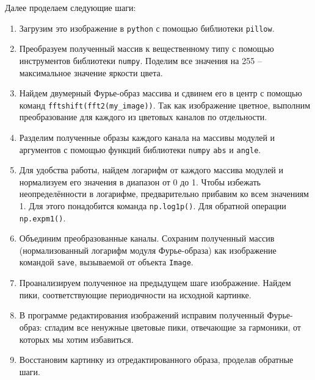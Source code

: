 \documentclass[a4paper, 12pt]{article}
\begin{document}
    Далее проделаем следующие шаги:
    \begin{enumerate}
        \item Загрузим это изображение в \texttt{python} с помощью библиотеки \texttt{pillow}.
        \item Преобразуем полученный массив к вещественному типу с помощью инструментов библиотеки \texttt{numpy}.
        Поделим все значения на 255 -- максимальное значение яркости цвета.
        \item Найдем двумерный Фурье-образ массива и сдвинем его в центр с помощью команд \texttt{fftshift(fft2(my\_image))}.
        Так как изображение цветное, выполним преобразование для каждого из цветовых каналов по отдельности.
        \item Разделим полученные образы каждого канала на массивы модулей и аргументов с помощью функций библиотеки \texttt{numpy} \texttt{abs} и \texttt{angle}.
        \item Для удобства работы, найдем логарифм от каждого массива модулей и нормализуем его
        значения в диапазон от 0 до 1. Чтобы избежать неопределённости в логарифме,
        предварительно прибавим ко всем значениям 1. Для этого понадобится команда \texttt{np.log1p()}. Для обратной операции \texttt{np.expm1()}.
        \item Объединим преобразованные каналы. Сохраним полученный массив (нормализованный логарифм модуля Фурье-образа)
        как изображение командой \texttt{save}, вызываемой от объекта \texttt{Image}.
        \item Проанализируем полученное на предыдущем шаге изображение. Найдем пики,
        соответствующие периодичности на исходной картинке.
        \item В программе редактирования изображений исправим полученный Фурье-образ: сгладим все ненужные цветовые пики, отвечающие за
        гармоники, от которых мы хотим избавиться.
        \item Восстановим картинку из отредактированного образа, проделав обратные шаги.  
    \end{enumerate}
    
\end{document}
